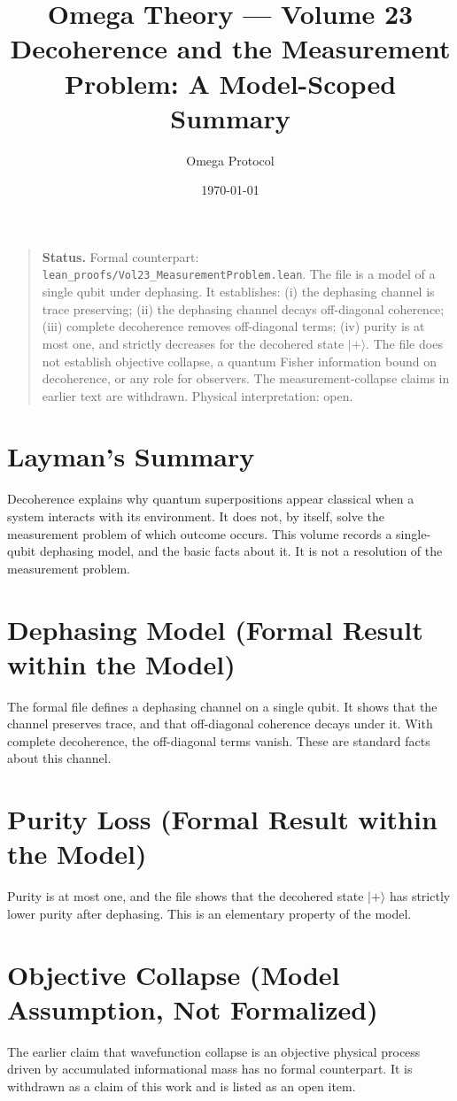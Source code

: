 \documentclass[11pt, a4paper]{article}
\title{Omega Theory --- Volume 23\\\Large Decoherence and the Measurement Problem: A Model-Scoped Summary}
\author{Omega Protocol}
\date{\today}
\begin{document}
\maketitle

\begin{quote}
\textbf{Status.} Formal counterpart: \texttt{lean\_proofs/Vol23\_MeasurementProblem.lean}. The file is a model of a single qubit under dephasing. It establishes: (i) the dephasing channel is trace preserving; (ii) the dephasing channel decays off-diagonal coherence; (iii) complete decoherence removes off-diagonal terms; (iv) purity is at most one, and strictly decreases for the decohered state $|+\rangle$. The file does not establish objective collapse, a quantum Fisher information bound on decoherence, or any role for observers. The measurement-collapse claims in earlier text are withdrawn. Physical interpretation: open.
\end{quote}

\section*{Layman's Summary}
Decoherence explains why quantum superpositions appear classical when a system interacts with its environment. It does not, by itself, solve the measurement problem of which outcome occurs. This volume records a single-qubit dephasing model, and the basic facts about it. It is not a resolution of the measurement problem.

\section{Dephasing Model (Formal Result within the Model)}
The formal file defines a dephasing channel on a single qubit. It shows that the channel preserves trace, and that off-diagonal coherence decays under it. With complete decoherence, the off-diagonal terms vanish. These are standard facts about this channel.

\section{Purity Loss (Formal Result within the Model)}
Purity is at most one, and the file shows that the decohered state $|+\rangle$ has strictly lower purity after dephasing. This is an elementary property of the model.

\section{Objective Collapse (Model Assumption, Not Formalized)}
The earlier claim that wavefunction collapse is an objective physical process driven by accumulated informational mass has no formal counterpart. It is withdrawn as a claim of this work and is listed as an open item.
\end{document}
